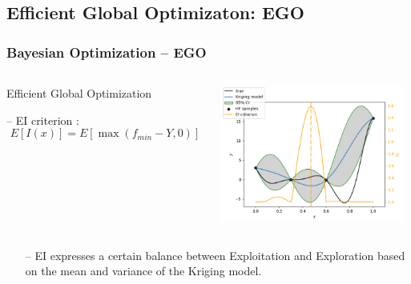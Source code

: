 \documentclass{beamer}
\theoremstyle{remark}
\theoremstyle{plain}
\begin{document}
\subsection{Efficient Global Optimizaton: EGO}    
\begin{frame}
  \frametitle{Bayesian Optimization -- EGO}
  \begin{columns}
  	\begin{column}{0.45\linewidth}
    \small
    Efficient Global Optimization \cite{Jones:1998:EGO:596070.596218} 
    
    \vspace{0.3cm}
    
      -- EI criterion \cite{Mockus1975}:\[ E[I(x)] = E[\max(f_{min}-Y, 0)]\]
      \end{column}
      \begin{column}{0.55\linewidth}
      \begin{center}
        \includegraphics[width=6cm]{Bayesian/EImax}
      \end{center}
      \end{column}
	\end{columns}
    \normalsize
   \begin{itemize}
      \item[--] EI expresses a certain balance between Exploitation and Exploration based on the mean and variance of the Kriging model.
      \end{itemize}
   
\end{frame}
\end{document}
